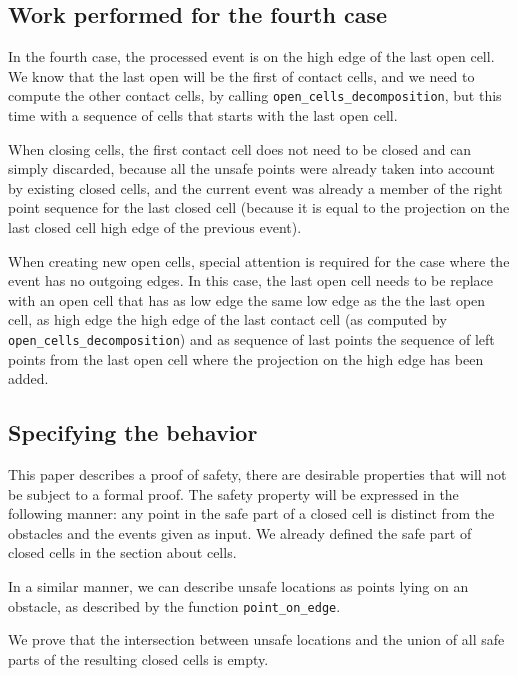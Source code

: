 \documentclass[a4paper, USenglish, cleveref, autoref, thm-restate]{lipics-v2021}
\begin{document}
\subsection{Work performed for the fourth case}
In the fourth case, the processed event is on the high edge of the
last open cell.  We know that the last open will be the first of
contact cells, and we need to compute the other contact cells, by
calling {\tt open\_cells\_decomposition}, but this time with a sequence
of cells that starts with the last open cell.

When closing cells, the first contact cell does not need to be closed
and can simply discarded, because all the unsafe points were already
taken into account by existing closed cells, and the current event was
already a member of the right point sequence for the last closed cell
(because it is equal to the projection on the last closed cell high
edge of the previous event).

When creating new open cells, special attention is required for the
case where the event has no outgoing edges.  In this case, the last
open cell needs to be replace with an open cell that has as low edge
the same low edge as the the last open cell, as high edge the high
edge of the last contact cell
(as computed by {\tt open\_cells\_decomposition}) and as sequence of
last points the sequence of left points from the last open cell where
the projection on the high edge has been added.

\subsection{Specifying the behavior}
This paper describes a proof of safety, there are desirable properties
that will not be subject to a formal proof.  The safety property will
be expressed in the following manner: any point in the safe part of a
closed cell is distinct from the obstacles and the events given as
input.  We already defined the safe part of closed cells in the
section about cells.

In a similar manner, we can describe unsafe locations as points lying
on an obstacle, as described by the function {\tt point\_on\_edge}.

We prove that the intersection between unsafe locations and the union
of all safe parts of the resulting closed cells is empty.
\end{document}
